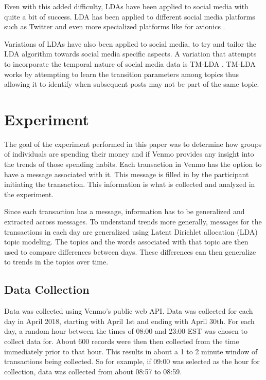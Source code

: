 \documentclass[conference]{IEEEtran}
\begin{document}
Even with this added difficulty, LDAs have been applied to social media with quite a bit of success. LDA has been applied to different social media platforms such as Twitter \cite{EmpericalTopicTwitter} and even more specialized platforms like for avionics \cite{LDA-Avionics}.

Variations of LDAs have also been applied to social media, to try and tailor the LDA algorithm towards social media specific aspects. A variation that attempts to incorporate the temporal nature of social media data is TM-LDA \cite{TM-LDA}. TM-LDA works by attempting to learn the transition parameters among topics thus allowing it to identify when subsequent posts may not be part of the same topic. 




\section{Experiment}
The goal of the experiment performed in this paper was to determine how groups of individuals are spending their money and if Venmo provides any insight into the trends of those spending habits. Each transaction in Venmo has the option to have a message associated with it. This message is filled in by the participant initiating the transaction. This information is what is collected and analyzed in the experiment. 

Since each transaction has a message, information has to be generalized and extracted across messages. To understand trends more generally, messages for the transactions in each day are generalized using Latent Dirichlet allocation (LDA) \cite{LDA} topic modeling. The topics and the words associated with that topic are then used to compare differences between days. These differences can then generalize to trends in the topics over time. 

\subsection{Data Collection}
Data was collected using Venmo's public web API. Data was collected for each day in April 2018, starting with April 1st and ending with April 30th. For each day, a random hour between the times of 08:00 and 23:00 EST was chosen to collect data for. About 600 records were then then collected from the time immediately prior to that hour. This results in about a 1 to 2 minute window of transactions being collected. So for example, if 09:00 was selected as the hour for collection, data was collected from about 08:57 to 08:59. 
\end{document}
